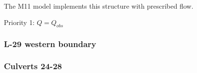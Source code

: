 The M11 model implements this structure with prescribed flow.

\begin{packed_items}
\item Priority 1: $Q = Q_{obs}$
\end{packed_items}

%
%
%

\clearpage

\subsubsection{L-29 western boundary}


\clearpage
\subsubsection{Culverts 24-28}

